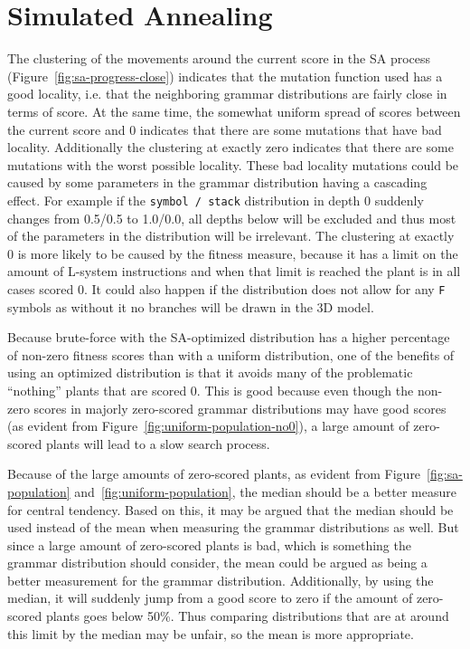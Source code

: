 \section{Simulated Annealing}
The clustering of the movements around the current score in the \gls{SA} process (Figure~\ref{fig:sa-progress-close}) indicates that the mutation function used has a good locality, i.e. that the neighboring grammar distributions are fairly close in terms of score.
At the same time, the somewhat uniform spread of scores between the current score and 0 indicates that there are some mutations that have bad locality.
Additionally the clustering at exactly zero indicates that there are some mutations with the worst possible locality.
These bad locality mutations could be caused by some parameters in the grammar distribution having a cascading effect.
For example if the \texttt{symbol / stack} distribution in depth 0 suddenly changes from 0.5/0.5 to 1.0/0.0, all depths below will be excluded and thus most of the parameters in the distribution will be irrelevant.
The clustering at exactly 0 is more likely to be caused by the fitness measure, because it has a limit on the amount of \gls{L-system} instructions and when that limit is reached the plant is in all cases scored 0.
It could also happen if the distribution does not allow for any \texttt{F} symbols as without it no branches will be drawn in the 3D model.

Because brute-force with the \gls{SA}-optimized distribution has a higher percentage of non-zero fitness scores than with a uniform distribution, one of the benefits of using an optimized distribution is that it avoids many of the problematic ``nothing'' plants that are scored 0.
This is good because even though the non-zero scores in majorly zero-scored grammar distributions may have good scores (as evident from Figure~\ref{fig:uniform-population-no0}), a large amount of zero-scored plants will lead to a slow search process.

Because of the large amounts of zero-scored plants, as evident from Figure~\ref{fig:sa-population} and~\ref{fig:uniform-population}, the median should be a better measure for central tendency.
Based on this, it may be argued that the median should be used instead of the mean when measuring the grammar distributions as well.
But since a large amount of zero-scored plants is bad, which is something the grammar distribution should consider, the mean could be argued as being a better measurement for the grammar distribution.
Additionally, by using the median, it will suddenly jump from a good score to zero if the amount of zero-scored plants goes below 50\%.
Thus comparing distributions that are at around this limit by the median may be unfair, so the mean is more appropriate.

